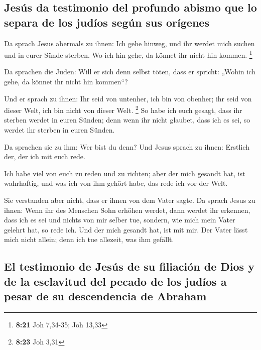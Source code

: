 \hypertarget{jesuxfas-da-testimonio-del-profundo-abismo-que-lo-separa-de-los-juduxedos-seguxfan-sus-oruxedgenes}{%
\subsection{Jesús da testimonio del profundo abismo que lo separa de los
judíos según sus
orígenes}\label{jesuxfas-da-testimonio-del-profundo-abismo-que-lo-separa-de-los-juduxedos-seguxfan-sus-oruxedgenes}}

 Da sprach Jesus abermals zu ihnen: Ich gehe hinweg, und
ihr werdet mich suchen und in eurer Sünde sterben. Wo ich hin gehe, da
könnet ihr nicht hin kommen. \footnote{\textbf{8:21} Joh 7,34-35; Joh
  13,33}

 Da sprachen die Juden: Will er sich denn selbst töten,
dass er spricht: „Wohin ich gehe, da könnet ihr nicht hin kommen``?

 Und er sprach zu ihnen: Ihr seid von untenher, ich bin
von obenher; ihr seid von dieser Welt, ich bin nicht von dieser Welt.
\footnote{\textbf{8:23} Joh 3,31}  So habe ich euch
gesagt, dass ihr sterben werdet in euren Sünden; denn wenn ihr nicht
glaubet, dass ich es sei, so werdet ihr sterben in euren Sünden.

 Da sprachen sie zu ihm: Wer bist du denn? Und Jesus
sprach zu ihnen: Erstlich der, der ich mit euch rede.

 Ich habe viel von euch zu reden und zu richten; aber der
mich gesandt hat, ist wahrhaftig, und was ich von ihm gehört habe, das
rede ich vor der Welt.

 Sie verstanden aber nicht, dass er ihnen von dem Vater
sagte.  Da sprach Jesus zu ihnen: Wenn ihr des Menschen
Sohn erhöhen werdet, dann werdet ihr erkennen, dass ich es sei und
nichts von mir selber tue, sondern, wie mich mein Vater gelehrt hat, so
rede ich.  Und der mich gesandt hat, ist mit mir. Der
Vater lässt mich nicht allein; denn ich tue allezeit, was ihm gefällt.

\hypertarget{el-testimonio-de-jesuxfas-de-su-filiaciuxf3n-de-dios-y-de-la-esclavitud-del-pecado-de-los-juduxedos-a-pesar-de-su-descendencia-de-abraham}{%
\subsection{El testimonio de Jesús de su filiación de Dios y de la
esclavitud del pecado de los judíos a pesar de su descendencia de
Abraham}\label{el-testimonio-de-jesuxfas-de-su-filiaciuxf3n-de-dios-y-de-la-esclavitud-del-pecado-de-los-juduxedos-a-pesar-de-su-descendencia-de-abraham}}

